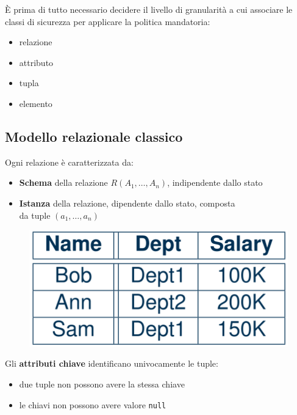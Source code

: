 \documentclass{report}
\begin{document}
È prima di tutto necessario decidere il livello di granularità a cui associare 
le classi di sicurezza per applicare la politica mandatoria:
\begin{itemize}
    \item relazione 
    \item attributo 
    \item tupla 
    \item elemento
\end{itemize}

\subsection{Modello relazionale classico}
Ogni relazione è caratterizzata da:
\begin{itemize}
    \item \textbf{Schema} della relazione $R(A_1, \dots, A_n)$, indipendente dallo stato 
    \item \textbf{Istanza} della relazione, dipendente dallo stato, composta 
    \\ da tuple $(a_1, \dots, a_n)$
\end{itemize}

\begin{figure}[H]
    \centering
    \includegraphics[width=0.5\linewidth]{images/classic.png}
\end{figure}

\noindent Gli \textbf{attributi chiave} identificano univocamente le tuple:
\begin{itemize}
    \item due tuple non possono avere la stessa chiave 
    \item le chiavi non possono avere valore \texttt{null}
\end{itemize}
\end{document}
